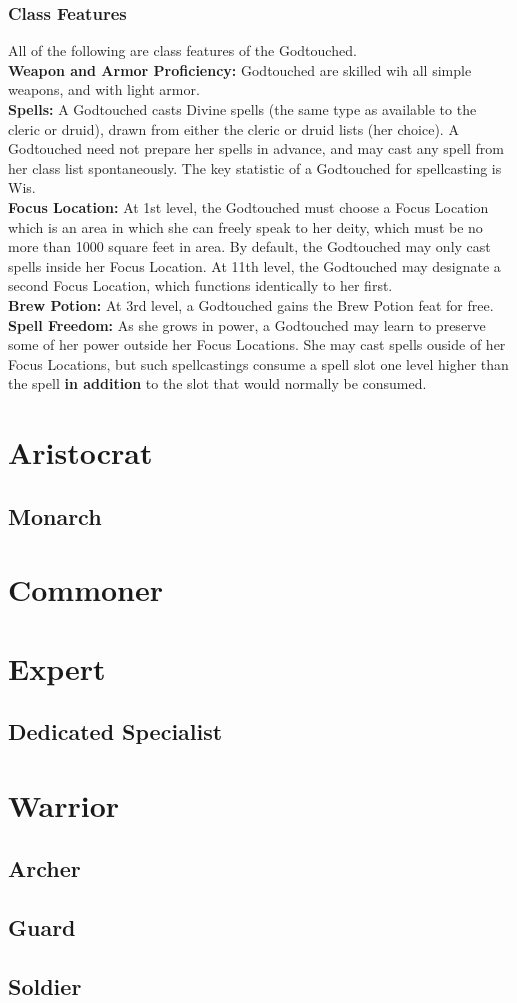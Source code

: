 \documentclass[11pt]{report}
\begin{document}
\subsubsection{Class Features}
All of the following are class features of the Godtouched. \\
\textbf{Weapon and Armor Proficiency:} Godtouched are skilled wih all simple
weapons, and with light armor. \\
\textbf{Spells:} A Godtouched casts Divine spells (the same type as available to
the cleric or druid), drawn from either the cleric or druid lists (her choice).
A Godtouched need not prepare her spells in advance, and may cast any spell from
her class list spontaneously. The key statistic of a Godtouched for spellcasting
is Wis. \\
\textbf{Focus Location:} At 1st level, the Godtouched must choose a Focus
Location which is an area in which she can freely speak to her deity, which must
be no more than 1000 square feet in area. By default, the Godtouched may only
cast spells inside her Focus Location. At 11th level, the Godtouched may
designate a second Focus Location, which functions identically to her first. \\
\textbf{Brew Potion:} At 3rd level, a Godtouched gains the Brew Potion feat for
free. \\
\textbf{Spell Freedom:} As she grows in power, a Godtouched may learn to
preserve some of her power outside her Focus Locations. She may cast spells
ouside of her Focus Locations, but such spellcastings consume a spell slot one
level higher than the spell \textbf{in addition} to the slot that would normally
be consumed. 

\section{Aristocrat}
\subsection{Monarch}

\section{Commoner}

\section{Expert}
\subsection{Dedicated Specialist}

\section{Warrior}
\subsection{Archer}
\subsection{Guard}
\subsection{Soldier}
\end{document}
